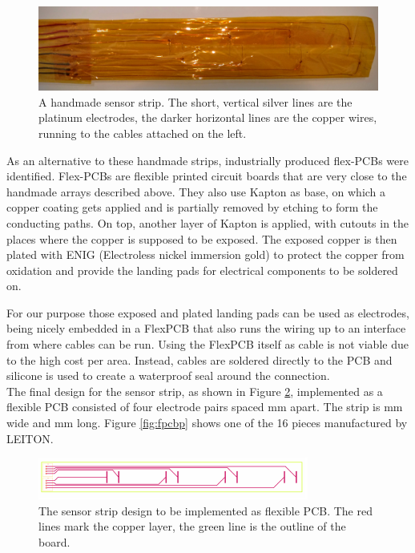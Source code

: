 \begin{figure}[H]
	\begin{center}
		\includegraphics[width=\textwidth]{images/v2.jpg} 
		\caption{A handmade sensor strip. The short, vertical silver lines are the platinum electrodes, the darker horizontal lines are the copper wires, running to the cables attached on the left.}
		\label{fig:v2}
	\end{center}
\end{figure}

As an alternative to these handmade strips, industrially produced flex-PCBs were identified. Flex-PCBs are flexible printed circuit boards that are very close to the handmade arrays described above. They also use Kapton as base, on which a copper coating gets applied and is partially removed by etching to form the conducting paths. On top, another layer of Kapton is applied, with cutouts in the places where the copper is supposed to be exposed. The exposed copper is then plated with ENIG (Electroless nickel immersion gold) to protect the copper from oxidation and provide the landing pads for electrical components to be soldered on.

For our purpose those exposed and plated landing pads can be used as electrodes, being nicely embedded in a FlexPCB that also runs the wiring up to an interface from where cables can be run. Using the FlexPCB itself as cable is not viable due to the high cost per area. Instead, cables are soldered directly to the PCB and silicone is used to create a waterproof seal around the connection.\\

The final design for the sensor strip, as shown in Figure \ref{fig:fpcbd}, implemented as a flexible PCB consisted of four electrode pairs spaced \unit[50]{mm} apart. The strip is \unit[25]{mm} wide and \unit[220]{mm} long. Figure \ref{fig:fpcbp} shows one of the 16 pieces manufactured by LEITON.

\begin{figure}
	\begin{center}
		\includegraphics[width=\textwidth]{images/fpcbd.pdf} 
		\caption{The sensor strip design to be implemented as flexible PCB. The red lines mark the copper layer, the green line is the outline of the board.}
		\label{fig:fpcbd}
	\end{center}
\end{figure}

